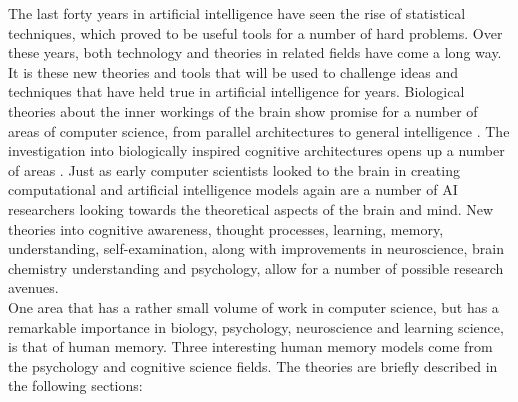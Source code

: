 The last forty years in artificial intelligence have seen the rise of statistical techniques, which proved to be useful tools for a number of hard problems. Over these years, both technology and theories in related fields have come a long way.  It is these new theories and tools that will be used to challenge ideas and techniques that have held true in artificial intelligence for years.  Biological theories about the inner workings of the brain show promise for a number of areas of computer science, from parallel architectures to general intelligence \cite{TOBICA, ERSATZ}.  The investigation into biologically inspired cognitive architectures opens up a number of areas \cite{BICA}.  Just as early computer scientists looked to the brain in creating computational and artificial intelligence models again are a number of AI researchers looking towards the theoretical aspects of the brain and mind.  New theories into cognitive awareness, thought processes, learning, memory, understanding, self-examination, along with improvements in neuroscience, brain chemistry understanding and psychology, allow for a number of possible research avenues.
\\
One area that has a rather small volume of work in computer science, but has a remarkable importance in biology, psychology, neuroscience and learning science, is that of human memory.  Three interesting human memory models come from the psychology and cognitive science fields.  The theories are briefly described in the following sections:
